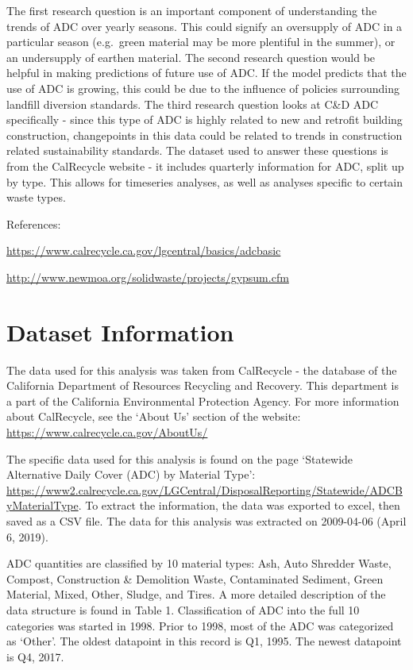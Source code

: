 \documentclass[12pt,]{article}
\begin{document}
The first research question is an important component of understanding
the trends of ADC over yearly seasons. This could signify an oversupply
of ADC in a particular season (e.g.~green material may be more plentiful
in the summer), or an undersupply of earthen material. The second
research question would be helpful in making predictions of future use
of ADC. If the model predicts that the use of ADC is growing, this could
be due to the influence of policies surrounding landfill diversion
standards. The third research question looks at C\&D ADC specifically -
since this type of ADC is highly related to new and retrofit building
construction, changepoints in this data could be related to trends in
construction related sustainability standards. The dataset used to
answer these questions is from the CalRecycle website - it includes
quarterly information for ADC, split up by type. This allows for
timeseries analyses, as well as analyses specific to certain waste
types.

References:

\url{https://www.calrecycle.ca.gov/lgcentral/basics/adcbasic}

\url{http://www.newmoa.org/solidwaste/projects/gypsum.cfm}

\newpage

\section{Dataset Information}\label{dataset-information}

The data used for this analysis was taken from CalRecycle - the database
of the California Department of Resources Recycling and Recovery. This
department is a part of the California Environmental Protection Agency.
For more information about CalRecycle, see the `About Us' section of the
website: \url{https://www.calrecycle.ca.gov/AboutUs/}

The specific data used for this analysis is found on the page `Statewide
Alternative Daily Cover (ADC) by Material Type':
\url{https://www2.calrecycle.ca.gov/LGCentral/DisposalReporting/Statewide/ADCByMaterialType}.
To extract the information, the data was exported to excel, then saved
as a CSV file. The data for this analysis was extracted on 2009-04-06
(April 6, 2019).

ADC quantities are classified by 10 material types: Ash, Auto Shredder
Waste, Compost, Construction \& Demolition Waste, Contaminated Sediment,
Green Material, Mixed, Other, Sludge, and Tires. A more detailed
description of the data structure is found in Table 1. Classification of
ADC into the full 10 categories was started in 1998. Prior to 1998, most
of the ADC was categorized as `Other'. The oldest datapoint in this
record is Q1, 1995. The newest datapoint is Q4, 2017.
\end{document}
